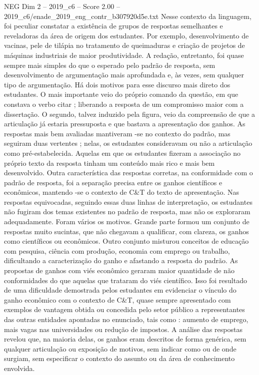 \begin{textsample}{NEG Dim 2 – 2019\_c6 – Score 2.00 – 2019\_c6/enade\_2019\_eng\_contr\_b307920d5e.txt}
Nesse contexto da linguagem, foi peculiar constatar a existência de grupos de respostas semelhantes e reveladoras da área de origem dos estudantes.
Por exemplo, desenvolvimento de vacinas, pele de tilápia no tratamento de queimaduras e criação de projetos de máquinas industriais de maior produtividade.
A redação, entretanto, foi quase sempre mais simples do que o esperado pelo padrão de resposta, sem desenvolvimento de argumentação mais aprofundada e, às vezes, sem qualquer tipo de argumentação.
Há dois motivos para esse discurso mais direto dos estudantes.
O mais importante veio do próprio comando da questão, em que constava o verbo citar ; liberando a resposta de um compromisso maior com a dissertação.
O segundo, talvez induzido pela figura, veio da compreensão de que a articulação já estaria pressuposta e que bastava a apresentação dos ganhos.
As respostas mais bem avaliadas mantiveram -se no contexto do padrão, mas seguiram duas vertentes ; nelas, os estudantes consideravam ou não a articulação como pré-estabelecida.
Aquelas em que os estudantes fizeram a associação no próprio texto da resposta tinham um conteúdo mais rico e mais bem desenvolvido.
Outra característica das respostas corretas, na conformidade com o padrão de resposta, foi a separação precisa entre os ganhos científicos e econômicos, mantendo -se o contexto de C\&T do texto de apresentação.
Nas respostas equivocadas, seguindo essas duas linhas de interpretação, os estudantes não fugiram dos temas existentes no padrão de resposta, mas não os exploraram adequadamente.
Foram vários os motivos.
Grande parte formou um conjunto de respostas muito sucintas, que não chegavam a qualificar, com clareza, os ganhos como científicos ou econômicos.
Outro conjunto misturou conceitos de educação com pesquisa, ciência com produção, economia com emprego ou trabalho, dificultando a caracterização do ganho e afastando a resposta do padrão.
As propostas de ganhos com viés econômico geraram maior quantidade de não conformidades do que aquelas que trataram do viés científico.
Isso foi resultado de uma dificuldade demostrada pelos estudantes em evidenciar o vínculo do ganho econômico com o contexto de C\&T, quase sempre apresentado com exemplos de vantagem obtida ou concedida pelo setor público a representantes das outras entidades apontadas no enunciado, tais como : aumento de emprego, mais vagas nas universidades ou redução de impostos.
A análise das respostas revelou que, na maioria delas, os ganhos eram descritos de forma genérica, sem qualquer articulação ou exposição de motivos, sem indicar como ou de onde surgiam, sem especificar o contexto do assunto ou da área de conhecimento envolvida.

\end{textsample}
